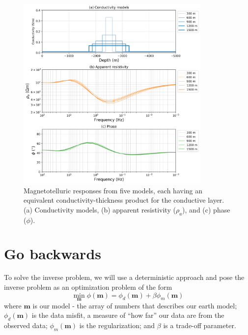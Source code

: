 \documentclass[11pt,oneside]{article}
\begin{document}
\begin{figure}[htb!]
    \centering
    \includegraphics[width=0.85\textwidth]{images/sigmat.png}
\caption{Magnetotelluric responses from five models, each having an equivalent conductivity-thickness product for the conductive layer. (a) Conductivity models, (b) apparent resistivity ($\rho_a$), and (c) phase ($\phi$).}
\label{fig:sigmat}
\end{figure}

\section{Go backwards}

To solve the inverse problem, we will use a deterministic approach and pose the inverse problem as an optimization problem of the form
\begin{equation}
\min_{\mathbf{m}} \phi(\mathbf{m}) = \phi_d(\mathbf{m}) + \beta\phi_m(\mathbf{m})
\end{equation}
where $\mathbf{m}$ is our model - the array of numbers that describes our earth model; $\phi_d(\mathbf{m})$ is the data misfit, a measure of ``how far'' our data are from the observed data; $\phi_m(\mathbf{m})$ is the regularization; and $\beta$ is a trade-off parameter.
\end{document}
